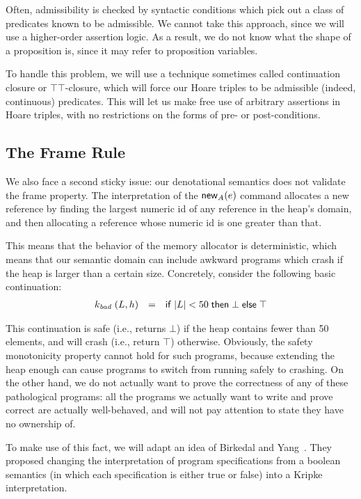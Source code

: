 Often, admissibility is checked by syntactic conditions which pick out
a class of predicates known to be admissible. We cannot take this
approach, since we will use a higher-order assertion logic. As a
result, we do not know what the shape of a proposition is, since it
may refer to proposition variables.

To handle this problem, we will use a technique sometimes called
continuation closure or $\top\top$-closure, which will force our Hoare
triples to be admissible (indeed, continuous) predicates. This will
let us make free use of arbitrary assertions in Hoare triples, with no
restrictions on the forms of pre- or post-conditions.

\subsection{The Frame Rule}

We also face a second sticky issue: our denotational semantics does
not validate the frame property. The interpretation of the
$\mathsf{new}_{A}(e)$ command allocates a new reference by finding the
largest numeric id of any reference in the heap's domain, and then
allocating a reference whose numeric id is one greater than that.

This means that the behavior of the memory allocator is deterministic,
which means that our semantic domain can include awkward programs
which crash if the heap is larger than a certain size. Concretely,
consider the following basic continuation:
\begin{displaymath}
  \begin{array}{lcl}
    k_{\mathit{bad}} \;(L,h) & = & \mathsf{if}\;{|L| < 50}\;\mathsf{then}\;{\bot}\;\mathsf{else}\;{\top}
  \end{array}
\end{displaymath}

This continuation is safe (i.e., returns $\bot$) if the heap contains
fewer than 50 elements, and will crash (i.e., return $\top$)
otherwise. Obviously, the safety monotonicity property cannot hold for
such programs, because extending the heap enough can cause programs to
switch from running safely to crashing. On the other hand, we do not
actually want to prove the correctness of any of these pathological
programs: all the programs we actually want to write and prove correct
are actually well-behaved, and will not pay attention to state they
have no ownership of.

To make use of this fact, we will adapt an idea of Birkedal and
Yang~\cite{birkedal-yang}. They proposed changing the interpretation
of program specifications from a boolean semantics (in which each
specification is either true or false) into a Kripke interpretation.

